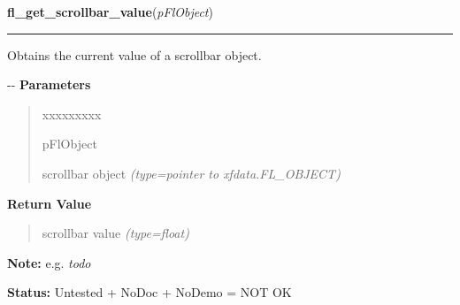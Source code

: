     \label{xformslib:flscrollbar:fl_get_scrollbar_value}

    \vspace{0.5ex}

\hspace{.8\funcindent}\begin{boxedminipage}{\funcwidth}

    \raggedright \textbf{fl\_get\_scrollbar\_value}(\textit{pFlObject})

    \vspace{-1.5ex}

    \rule{\textwidth}{0.5\fboxrule}
\setlength{\parskip}{2ex}

Obtains the current value of a scrollbar object.

-{}-
\setlength{\parskip}{1ex}
      \textbf{Parameters}
      \vspace{-1ex}

      \begin{quote}
        \begin{Ventry}{xxxxxxxxx}

          \item[pFlObject]


scrollbar object
            {\it (type=pointer to xfdata.FL\_OBJECT)}

        \end{Ventry}

      \end{quote}

      \textbf{Return Value}
    \vspace{-1ex}

      \begin{quote}

scrollbar value
      {\it (type=float)}

      \end{quote}

\textbf{Note:} 
e.g. \emph{todo}


\textbf{Status:} 
Untested + NoDoc + NoDemo = NOT OK


    \end{boxedminipage}

    \label{xformslib:flscrollbar:fl_set_scrollbar_value}

